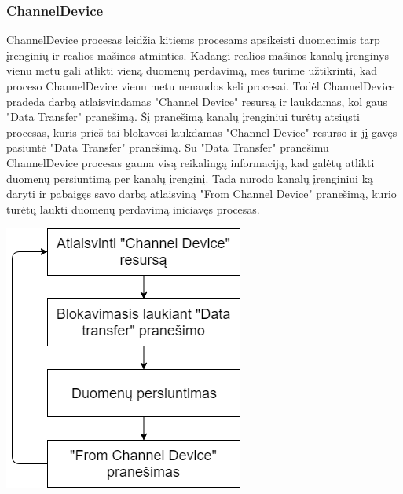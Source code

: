 \documentclass{scrartcl}
\begin{document}
      \subsubsection{ChannelDevice}
        ChannelDevice procesas leidžia kitiems procesams apsikeisti duomenimis tarp įrenginių ir realios mašinos atminties. Kadangi realios mašinos kanalų įrenginys vienu metu gali atlikti vieną duomenų perdavimą, mes turime užtikrinti, kad proceso ChannelDevice vienu metu nenaudos keli procesai. Todėl ChannelDevice pradeda darbą atlaisvindamas "Channel Device" resursą ir laukdamas, kol gaus "Data Transfer" pranešimą. Šį pranešimą kanalų įrenginiui turėtų atsiųsti procesas, kuris prieš tai blokavosi laukdamas "Channel Device" resurso ir jį gavęs pasiuntė "Data Transfer" pranešimą. Su "Data Transfer" pranešimu ChannelDevice procesas gauna visą reikalingą informaciją, kad galėtų atlikti duomenų persiuntimą per kanalų įrenginį. Tada nurodo kanalų įrenginiui ką daryti ir pabaigęs savo darbą atlaisviną "From Channel Device" pranešimą, kurio turėtų laukti duomenų perdavimą iniciavęs procesas.
        \begin{center}
          \includegraphics[scale=0.5]{ChannelDevice}
        \end{center}
\end{document}
